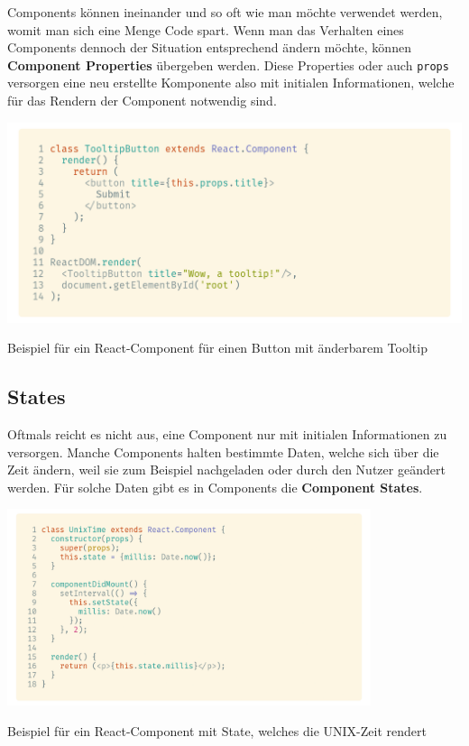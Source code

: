 Components können ineinander und so oft wie man möchte verwendet werden, womit man sich eine Menge Code spart. Wenn man das Verhalten eines Components dennoch der Situation entsprechend ändern möchte, können \textbf{Component Properties} übergeben werden. Diese Properties oder auch \lstinline{props} versorgen eine neu erstellte Komponente also mit initialen Informationen, welche für das Rendern der Component notwendig sind.

\begin{code}[h]
    \centering
    \includegraphics[width=1\textwidth]{images/React/button.png}
    \vspace{-25pt}
    \caption{Beispiel für ein React-Component für einen Button mit änderbarem Tooltip}
\end{code}

\subsection{States}

Oftmals reicht es nicht aus, eine Component nur mit initialen Informationen zu versorgen. Manche Components halten bestimmte Daten, welche sich über die Zeit ändern, weil sie zum Beispiel nachgeladen oder durch den Nutzer geändert werden. Für solche Daten gibt es in Components die \textbf{Component States}.

\begin{code}[h]
    \centering
    \includegraphics[width=0.8\textwidth]{images/React/unixtime.png}
    \vspace{-12pt}
    \caption{Beispiel für ein React-Component mit State, welches die UNIX-Zeit rendert}
\end{code}